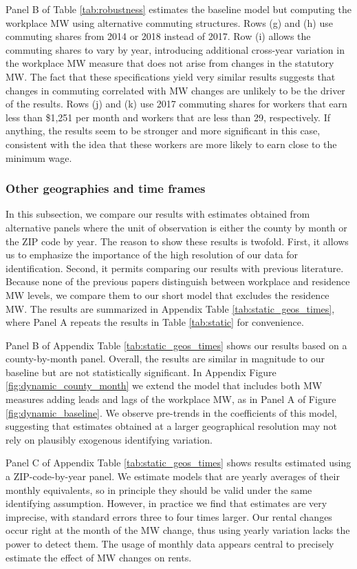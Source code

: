 Panel B of Table \ref{tab:robustness} estimates the baseline model but 
computing the workplace MW using alternative commuting structures.
Rows (g) and (h) use commuting shares from 2014 or 2018 instead of 2017.
Row (i) allows the commuting shares to vary by year, introducing additional
cross-year variation in the workplace MW measure that does not arise from 
changes in the statutory MW.
The fact that these specifications yield very similar results suggests that 
changes in commuting correlated with MW changes are unlikely to be the driver
of the results.
Rows (j) and (k) use 2017 commuting shares for workers that earn less than 
\$1,251 per month and workers that are less than 29, respectively.
If anything, the results seem to be stronger and more significant in this case, 
consistent with the idea that these workers are more likely to earn close to the 
minimum wage.

\subsubsection*{Other geographies and time frames}

In this subsection, we compare our results with estimates obtained from 
alternative panels where the unit of observation is either the county by month 
or the ZIP code by year.
The reason to show these results is twofold.
First, it allows us to emphasize the importance of the high resolution of 
our data for identification.
Second, it permits comparing our results with previous literature.
Because none of the previous papers distinguish between workplace and residence
MW levels, we compare them to our short model that excludes the residence MW.
The results are summarized in Appendix Table \ref{tab:static_geos_times}, 
where Panel A repeats the results in Table \ref{tab:static} for convenience.

Panel B of Appendix Table \ref{tab:static_geos_times} shows our results based 
on a county-by-month panel.
Overall, the results are similar in magnitude to our baseline but are not
statistically significant.
In Appendix Figure \ref{fig:dynamic_county_month} we extend the model
that includes both MW measures adding leads and lags of the workplace MW, as
in Panel A of Figure \ref{fig:dynamic_baseline}.
We observe pre-trends in the coefficients of this model,
suggesting that estimates obtained at a larger geographical resolution may not 
rely on plausibly exogenous identifying variation.

Panel C of Appendix Table \ref{tab:static_geos_times} shows results estimated 
using a ZIP-code-by-year panel.
We estimate models that are yearly averages of their monthly equivalents, 
so in principle they should be valid under the same identifying assumption.
However, in practice we find that estimates are very imprecise, with standard
errors three to four times larger.
Our rental changes occur right at the month of the MW change, thus using 
yearly variation lacks the power to detect them.
The usage of monthly data appears central to precisely estimate the 
effect of MW changes on rents.

